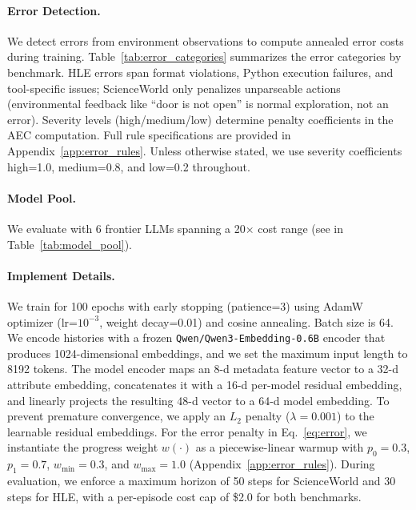 \paragraph{Error Detection.}
We detect errors from environment observations to compute annealed error costs during training.
Table~\ref{tab:error_categories} summarizes the error categories by benchmark.
HLE errors span format violations, Python execution failures, and tool-specific issues; ScienceWorld only penalizes unparseable actions (environmental feedback like ``door is not open'' is normal exploration, not an error).
Severity levels (high/medium/low) determine penalty coefficients in the AEC computation.
Full rule specifications are provided in Appendix~\ref{app:error_rules}.
Unless otherwise stated, we use severity coefficients high=1.0, medium=0.8, and low=0.2 throughout.



\paragraph{Model Pool.}
We evaluate with 6 frontier LLMs spanning a 20$\times$ cost range (see in Table~\ref{tab:model_pool}).



\paragraph{Implement Details.}
We train for 100 epochs with early stopping (patience=3) using AdamW optimizer (lr=$10^{-3}$, weight decay=0.01) and cosine annealing. Batch size is 64.
We encode histories with a frozen \texttt{Qwen/Qwen3-Embedding-0.6B} encoder that produces 1024-dimensional embeddings, and we set the maximum input length to 8192 tokens.
The model encoder maps an 8-d metadata feature vector to a 32-d attribute embedding, concatenates it with a 16-d per-model residual embedding, and linearly projects the resulting 48-d vector to a 64-d model embedding. To prevent premature convergence, we apply an $L_2$ penalty ($\lambda=0.001$) to the learnable residual embeddings.
For the error penalty in Eq.~\ref{eq:error}, we instantiate the progress weight $w(\cdot)$ as a piecewise-linear warmup with $p_0{=}0.3$, $p_1{=}0.7$, $w_{\min}{=}0.3$, and $w_{\max}{=}1.0$ (Appendix~\ref{app:error_rules}).
During evaluation, we enforce a maximum horizon of 50 steps for ScienceWorld and 30 steps for HLE, with a per-episode cost cap of \$2.0 for both benchmarks.


